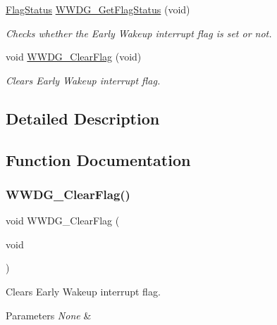 \begin{DoxyCompactItemize}
\hyperlink{group___exported__types_ga89136caac2e14c55151f527ac02daaff}{Flag\+Status} \hyperlink{group___w_w_d_g___private___functions_ga7df4882d45918b9b8249dfca1e44fabc}{W\+W\+D\+G\+\_\+\+Get\+Flag\+Status} (void)
\begin{DoxyCompactList}\small\item\em Checks whether the Early Wakeup interrupt flag is set or not. \end{DoxyCompactList}\item 
void \hyperlink{group___w_w_d_g___private___functions_gabd2b5a6317c2e1a3ab0795838ce59dd2}{W\+W\+D\+G\+\_\+\+Clear\+Flag} (void)
\begin{DoxyCompactList}\small\item\em Clears Early Wakeup interrupt flag. \end{DoxyCompactList}\end{DoxyCompactItemize}


\subsection{Detailed Description}


\subsection{Function Documentation}
\mbox{\label{group___w_w_d_g___private___functions_gabd2b5a6317c2e1a3ab0795838ce59dd2}} 
\subsubsection{\texorpdfstring{W\+W\+D\+G\+\_\+\+Clear\+Flag()}{WWDG\_ClearFlag()}}
{\footnotesize\ttfamily void W\+W\+D\+G\+\_\+\+Clear\+Flag (\begin{DoxyParamCaption}\item[{void}]{ }\end{DoxyParamCaption})}



Clears Early Wakeup interrupt flag. 


\begin{DoxyParams}{Parameters}
{\em None} & \\
\hline
\end{DoxyParams}

